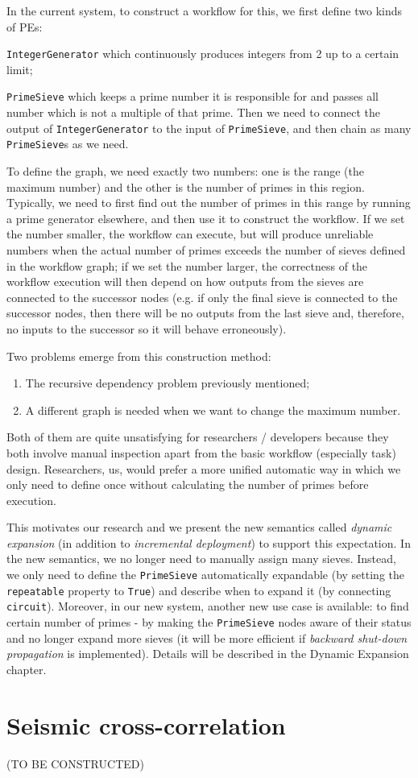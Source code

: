 \newcommand{\cdIntGen}{\lstinline|IntegerGenerator|\xspace}
\newcommand{\cdSieve}{\lstinline|PrimeSieve|\xspace}

In the current \dpy system, to construct a workflow for this, we first define two kinds of PEs:
\begin{enumerate*}
	\item \cdIntGen which continuously produces integers from 2 up to a certain limit;
	\item \cdSieve which keeps a prime number it is responsible for and passes all number which is not a multiple of that prime. Then we need to connect the output of \cdIntGen to the input of \cdSieve , and then chain as many \cdSieve{}s as we need.
\end{enumerate*}

To define the graph, we need exactly two numbers: one is the range (\ie the maximum number) and the other is the number of primes in this region. Typically, we need to first find out the number of primes in this range by running a prime generator elsewhere, and then use it to construct the workflow. If we set the number smaller, the workflow can execute, but will produce unreliable numbers when the actual number of primes exceeds the number of sieves defined in the workflow graph; if we set the number larger, the correctness of the workflow execution will then depend on how outputs from the sieves are connected to the successor nodes (e.g. if only the final sieve is connected to the successor nodes, then there will be no outputs from the last sieve and, therefore, no inputs to the successor so it will behave erroneously).

Two problems emerge from this construction method:
\begin{enumerate}
	\item The recursive dependency problem previously mentioned;
	\item A different graph is needed when we want to change the maximum number.
\end{enumerate}

Both of them are quite unsatisfying for researchers / developers because they both involve manual inspection apart from the basic workflow (especially task) design. Researchers, \eg us, would prefer a more unified automatic way in which we only need to define once without calculating the number of primes before execution.

This motivates our research and we present the new semantics called \emph{dynamic expansion} (in addition to \emph{incremental deployment}) to support this expectation. In the new semantics, we no longer need to manually assign many sieves. Instead, we only need to define the \cdSieve automatically expandable (by setting the \lstinline|repeatable| property to \lstinline|True|) and describe when to expand it (by connecting \lstinline|circuit|). Moreover, in our new system, another new use case is available: to find certain number of primes - by making the \cdSieve nodes aware of their status and no longer expand more sieves (it will be more efficient if \emph{backward shut-down propagation} is implemented). Details will be described in the Dynamic Expansion chapter.

\section{Seismic cross-correlation}
(TO BE CONSTRUCTED)
